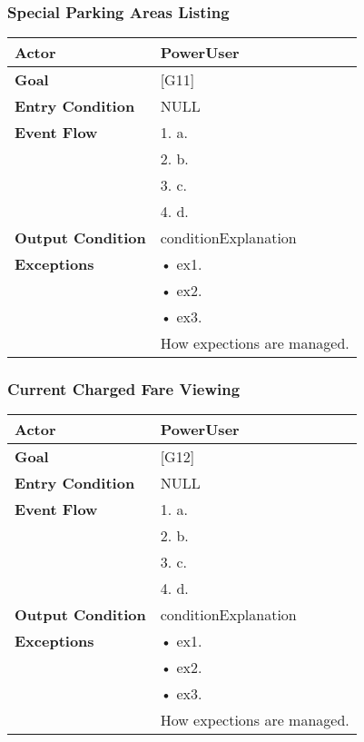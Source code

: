 \subsubsection{Special Parking Areas Listing}
\begin{tabular}{| l | p{8cm} |}
\hline
\textbf{Actor}      &       PowerUser \\
\hline
\textbf{Goal}       &       [G11]\\
\hline
\textbf{Entry Condition} &  NULL\\
\hline
\textbf{Event Flow}     &   1.	a.\\&
                                            2.	b.\\&
                                            3.	c.\\&
                                            4.  d.\\
\hline
\textbf{Output Condition} & conditionExplanation\\
\hline
\textbf{Exceptions} &       •   ex1.\\& 
                            •	ex2.\\&
                            •	ex3.\\& 
                           How expections are managed.\\
\hline
\end{tabular} 


\subsubsection{Current Charged Fare Viewing}
\begin{tabular}{| l | p{8cm} |}
\hline
\textbf{Actor}      &       PowerUser \\
\hline
\textbf{Goal}       &       [G12]\\
\hline
\textbf{Entry Condition} &  NULL\\
\hline
\textbf{Event Flow}     &   1.	a.\\&
                                            2.	b.\\&
                                            3.	c.\\&
                                            4.  d.\\
\hline
\textbf{Output Condition} & conditionExplanation\\
\hline
\textbf{Exceptions} &       •   ex1.\\& 
                            •	ex2.\\&
                            •	ex3.\\& 
                           How expections are managed.\\
\hline
\end{tabular} 


